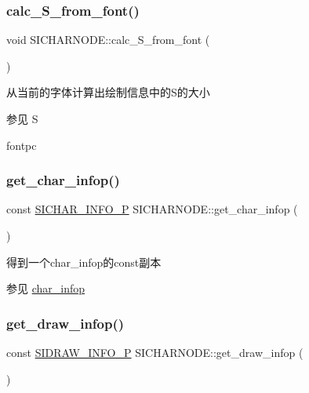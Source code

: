 \subsubsection{\texorpdfstring{calc\+\_\+\+S\+\_\+from\+\_\+font()}{calc\_S\_from\_font()}}
{\footnotesize\ttfamily void S\+I\+C\+H\+A\+R\+N\+O\+D\+E\+::calc\+\_\+\+S\+\_\+from\+\_\+font (\begin{DoxyParamCaption}{ }\end{DoxyParamCaption})}



从当前的字体计算出绘制信息中的\+S的大小 

\begin{DoxySeeAlso}{参见}
S 

fontpc 
\end{DoxySeeAlso}
\mbox{\label{class_s_i_c_h_a_r_n_o_d_e_a95039205cd53a18d6f1b8ef1a80c90c2}} 
\subsubsection{\texorpdfstring{get\+\_\+char\+\_\+infop()}{get\_char\_infop()}}
{\footnotesize\ttfamily const \hyperlink{class_s_i_c_h_a_r___i_n_f_o}{S\+I\+C\+H\+A\+R\+\_\+\+I\+N\+F\+O\+\_\+P} S\+I\+C\+H\+A\+R\+N\+O\+D\+E\+::get\+\_\+char\+\_\+infop (\begin{DoxyParamCaption}{ }\end{DoxyParamCaption})\hspace{0.3cm}{\ttfamily [inline]}}



得到一个char\+\_\+infop的const副本 

\begin{DoxySeeAlso}{参见}
\hyperlink{class_s_i_c_h_a_r_n_o_d_e_a03e4b28edd8566a6b605f4caeeb7bd6f}{char\+\_\+infop} 
\end{DoxySeeAlso}
\mbox{\label{class_s_i_c_h_a_r_n_o_d_e_a96a8903f87343bb9096a8ed014e789be}} 
\subsubsection{\texorpdfstring{get\+\_\+draw\+\_\+infop()}{get\_draw\_infop()}}
{\footnotesize\ttfamily const \hyperlink{class_s_i_d_r_a_w___i_n_f_o}{S\+I\+D\+R\+A\+W\+\_\+\+I\+N\+F\+O\+\_\+P} S\+I\+C\+H\+A\+R\+N\+O\+D\+E\+::get\+\_\+draw\+\_\+infop (\begin{DoxyParamCaption}{ }\end{DoxyParamCaption})\hspace{0.3cm}{\ttfamily [inline]}}



